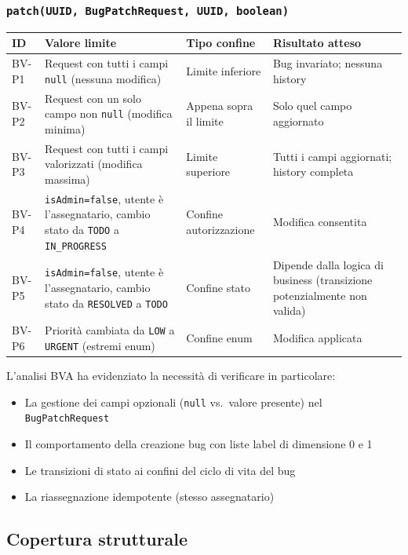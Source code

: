 ﻿\documentclass[a4paper,11pt]{article}
\begin{document}
\subsubsection{\texttt{patch(UUID, BugPatchRequest, UUID, boolean)}}

\begin{tabular}{|l|p{5.5cm}|p{3cm}|p{4cm}|}
\hline
\textbf{ID} & \textbf{Valore limite} & \textbf{Tipo confine} & \textbf{Risultato atteso} \\
\hline
BV-P1 & Request con tutti i campi \texttt{null} (nessuna modifica) & Limite inferiore & Bug invariato; nessuna history \\
\hline
BV-P2 & Request con un solo campo non \texttt{null} (modifica minima) & Appena sopra il limite & Solo quel campo aggiornato \\
\hline
BV-P3 & Request con tutti i campi valorizzati (modifica massima) & Limite superiore & Tutti i campi aggiornati; history completa \\
\hline
BV-P4 & \texttt{isAdmin=false}, utente \`e l'assegnatario, cambio stato da \texttt{TODO} a \texttt{IN\_PROGRESS} & Confine autorizzazione & Modifica consentita \\
\hline
BV-P5 & \texttt{isAdmin=false}, utente \`e l'assegnatario, cambio stato da \texttt{RESOLVED} a \texttt{TODO} & Confine stato & Dipende dalla logica di business (transizione potenzialmente non valida) \\
\hline
BV-P6 & Priorit\`a cambiata da \texttt{LOW} a \texttt{URGENT} (estremi enum) & Confine enum & Modifica applicata \\
\hline
\end{tabular}

\vspace{0.5cm}

L'analisi BVA ha evidenziato la necessit\`a di verificare in particolare:
\begin{itemize}
  \item La gestione dei campi opzionali (\texttt{null} vs.\ valore presente) nel \texttt{BugPatchRequest}
  \item Il comportamento della creazione bug con liste label di dimensione 0 e 1
  \item Le transizioni di stato ai confini del ciclo di vita del bug
  \item La riassegnazione idempotente (stesso assegnatario)
\end{itemize}

\subsection{Copertura strutturale}
\end{document}

